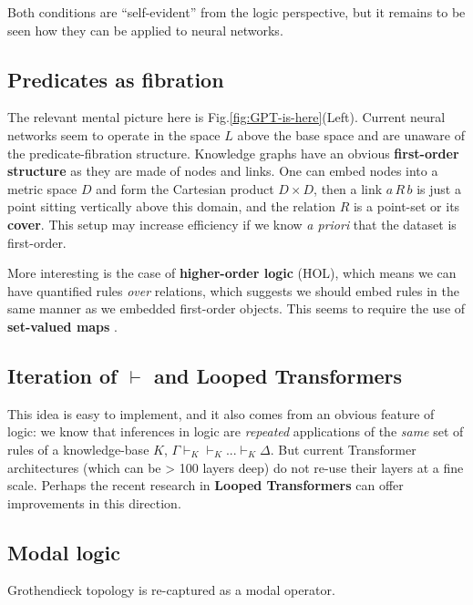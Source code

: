 \documentclass[runningheads]{llncs}
\begin{document}
Both conditions are ``self-evident'' from the logic perspective, but it remains to be seen how they can be applied to neural networks.

\subsection{Predicates as fibration}

The relevant mental picture here is Fig.\ref{fig:GPT-is-here}(Left). Current neural networks seem to operate in the space $L$ above the base space and are unaware of the predicate-fibration structure.  Knowledge graphs have an obvious \textbf{first-order structure} as they are made of nodes and links.  One can embed nodes into a metric space $D$ and form the Cartesian product $D \times D$, then a link $a\,R\,b$ is just a point sitting vertically above this domain, and the relation $R$ is a point-set or its \textbf{cover}.  This setup may increase efficiency if we know \textit{a priori} that the dataset is first-order.

More interesting is the case of \textbf{higher-order logic} (HOL), which means we can have quantified rules \textit{over} relations, which suggests we should embed rules in the same manner as we embedded first-order objects.  This seems to require the use of \textbf{set-valued maps} \cite{Aubin1990}.

\subsection{Iteration of $\vdash$ and Looped Transformers}

This idea is easy to implement, and it also comes from an obvious feature of logic:  we know that inferences in logic are \textit{repeated} applications of the \textit{same} set of rules of a knowledge-base $K$, $\Gamma \vdash_K \vdash_K ... \vdash_K \Delta$.  But current Transformer architectures (which can be > 100 layers deep) do not re-use their layers at a fine scale.  Perhaps the recent research in \textbf{Looped Transformers} \cite{Yang2024} \cite{Giannou2023} can offer improvements in this direction.

\subsection{Modal logic}

Grothendieck topology is re-captured as a modal operator.
\end{document}
